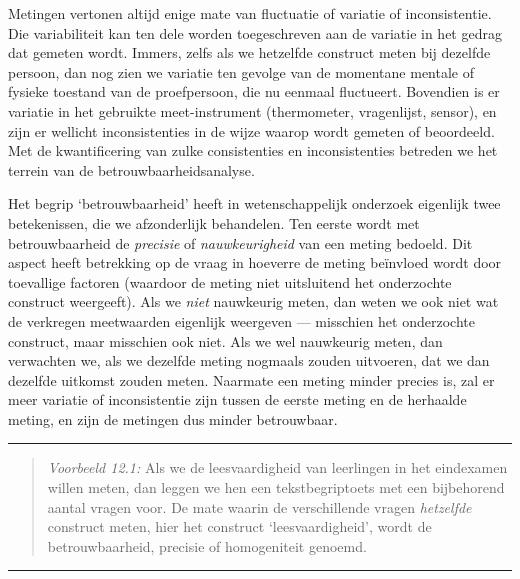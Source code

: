 \documentclass[
]{book}
\begin{document}
Metingen vertonen altijd enige mate van fluctuatie of variatie of
inconsistentie. Die variabiliteit kan ten dele worden toegeschreven aan
de variatie in het gedrag dat gemeten wordt. Immers, zelfs als we
hetzelfde construct meten bij dezelfde persoon, dan nog zien we variatie
ten gevolge van de momentane mentale of fysieke toestand van de
proefpersoon, die nu eenmaal fluctueert. Bovendien is er variatie in het
gebruikte meet-instrument (thermometer, vragenlijst, sensor), en zijn er
wellicht inconsistenties in de wijze waarop wordt gemeten of beoordeeld.
Met de kwantificering van zulke consistenties en inconsistenties
betreden we het terrein van de betrouwbaarheidsanalyse.

Het begrip `betrouwbaarheid' heeft in wetenschappelijk onderzoek
eigenlijk twee betekenissen, die we afzonderlijk behandelen. Ten eerste
wordt met betrouwbaarheid de \emph{precisie} of \emph{nauwkeurigheid} van een
meting bedoeld. Dit aspect heeft betrekking op de vraag in hoeverre de
meting beïnvloed wordt door toevallige factoren (waardoor de meting niet
uitsluitend het onderzochte construct weergeeft). Als we \emph{niet}
nauwkeurig meten, dan weten we ook niet wat de verkregen meetwaarden
eigenlijk weergeven --- misschien het onderzochte construct, maar
misschien ook niet. Als we wel nauwkeurig meten, dan verwachten we, als
we dezelfde meting nogmaals zouden uitvoeren, dat we dan dezelfde
uitkomst zouden meten. Naarmate een meting minder precies is, zal er
meer variatie of inconsistentie zijn tussen de eerste meting en de
herhaalde meting, en zijn de metingen dus minder betrouwbaar.

\begin{center}\rule{0.5\linewidth}{0.5pt}\end{center}

\begin{quote}
\emph{Voorbeeld 12.1:} Als we de leesvaardigheid van
leerlingen in het eindexamen willen meten, dan leggen we hen een
tekstbegriptoets met een bijbehorend aantal vragen voor. De mate waarin
de verschillende vragen \emph{hetzelfde} construct meten, hier het construct `leesvaardigheid',
wordt de betrouwbaarheid, precisie of homogeniteit genoemd.
\end{quote}

\begin{center}\rule{0.5\linewidth}{0.5pt}\end{center}
\end{document}
